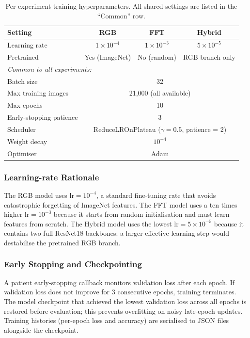 \documentclass[12pt, a4paper]{article}
\begin{document}
\begin{table}[H]
\centering
\caption{Per-experiment training hyperparameters.  All shared settings
are listed in the ``Common'' row.}
\label{tab:hparams}
\begin{tabular}{lccc}
\toprule
\textbf{Setting} & \textbf{RGB} & \textbf{FFT} & \textbf{Hybrid} \\
\midrule
Learning rate & $1 \times 10^{-4}$ & $1 \times 10^{-3}$ &
  $5 \times 10^{-5}$ \\
Pretrained & Yes (ImageNet) & No (random) & RGB branch only \\
\midrule
\multicolumn{4}{l}{\textit{Common to all experiments:}} \\[2pt]
Batch size & \multicolumn{3}{c}{32} \\
Max training images & \multicolumn{3}{c}{21,000 (all available)} \\
Max epochs & \multicolumn{3}{c}{10} \\
Early-stopping patience & \multicolumn{3}{c}{3} \\
Scheduler & \multicolumn{3}{c}{ReduceLROnPlateau ($\gamma = 0.5$,
  patience = 2)} \\
Weight decay & \multicolumn{3}{c}{$10^{-4}$} \\
Optimiser & \multicolumn{3}{c}{Adam} \\
\bottomrule
\end{tabular}
\end{table}

\subsubsection{Learning-rate Rationale}

The RGB model uses $\text{lr} = 10^{-4}$, a standard fine-tuning rate that
avoids catastrophic forgetting of ImageNet features.  The FFT model uses a
ten times higher $\text{lr} = 10^{-3}$ because it starts from random
initialisation and must learn features from scratch.  The Hybrid model uses
the lowest $\text{lr} = 5 \times 10^{-5}$ because it contains two full
ResNet18 backbones: a larger effective learning step would destabilise the
pretrained RGB branch.

\subsubsection{Early Stopping and Checkpointing}

A patient early-stopping callback monitors validation loss after each epoch.
If validation loss does not improve for 3 consecutive epochs, training
terminates.  The model checkpoint that achieved the lowest validation loss
across all epochs is restored before evaluation; this prevents overfitting
on noisy late-epoch updates.  Training histories (per-epoch loss and
accuracy) are serialised to JSON files alongside the checkpoint.
\end{document}
